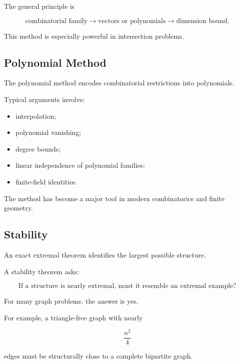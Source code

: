 The general principle is

\[
\boxed{
\text{combinatorial family}
\longrightarrow
\text{vectors or polynomials}
\longrightarrow
\text{dimension bound}.
}
\]

This method is especially powerful in intersection problems.

\subsection{Polynomial Method}
\label{subsec:polynomial-method-extremal}

The polynomial method encodes combinatorial restrictions into
polynomials.

Typical arguments involve:

\begin{itemize}
    \item interpolation;
    \item polynomial vanishing;
    \item degree bounds;
    \item linear independence of polynomial families;
    \item finite-field identities.
\end{itemize}

The method has become a major tool in modern combinatorics and finite
geometry.

\subsection{Stability}
\label{subsec:stability-extremal}

An exact extremal theorem identifies the largest possible structure.

A stability theorem asks:

\[
\boxed{
\text{If a structure is nearly extremal, must it resemble an extremal
example?}
}
\]

For many graph problems, the answer is yes.

For example, a triangle-free graph with nearly

\[
\frac{n^2}{4}
\]

edges must be structurally close to a complete bipartite graph.

